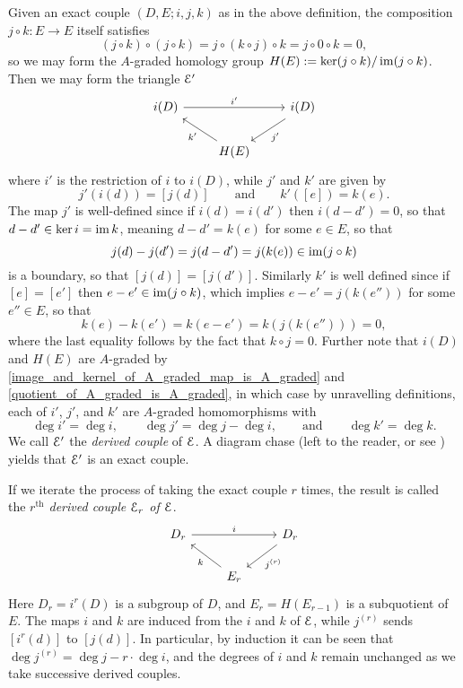 \documentclass[../main.tex]{subfiles}
\begin{document}
\begin{definition}
    Given an exact couple $(D,E;i,j,k)$ as in the above definition, the composition $j\circ k:E\to E$ itself satisfies 
    \[(j\circ k)\circ (j\circ k)=j\circ(k\circ j)\circ k=j\circ 0\circ k=0,\]
    so we may form the $A$-graded homology group $H(E):=\ker(j\circ k)/\operatorname{im}(j\circ k)$. Then we may form the triangle $\mathcal E'$
    \[\begin{tikzcd}
        {i(D)} && {i(D)} \\
        & {H(E)}
        \arrow["{i'}", from=1-1, to=1-3]
        \arrow["{j'}", from=1-3, to=2-2]
        \arrow["{k'}", from=2-2, to=1-1]
    \end{tikzcd}\]
    where $i'$ is the restriction of $i$ to $i(D)$, while $j'$ and $k'$ are given by
    \[j'(i(d))=[j(d)]\qquad\text{and}\qquad k'([e])=k(e).\]
    The map $j'$ is well-defined since if $i(d)=i(d')$ then $i(d-d')=0$, so that $d-d'\in\ker i=\operatorname{im} k$, meaning $d-d'= k(e)$ for some $e\in E$, so that 
    \[j(d)-j(d')=j(d-d')=j(k(e))\in\operatorname{im}(j\circ k)\]
    is a boundary, so that $[j(d)]=[j(d')]$. Similarly $k'$ is well defined since if $[e]=[e']$ then $e-e'\in\operatorname{im}(j\circ k)$, which implies $e-e'=j(k(e''))$ for some $e''\in E$, so that
    \[k(e)-k(e')=k(e-e')=k(j(k(e'')))=0,\]
    where the last equality follows by the fact that $k\circ j=0$. Further note that $i(D)$ and $H(E)$ are $A$-graded by \autoref{image_and_kernel_of_A_graded_map_is_A_graded} and \autoref{quotient_of_A_graded_is_A_graded}, in which case by unravelling definitions, each of $i'$, $j'$, and $k'$ are $A$-graded homomorphisms with
    \[\deg i'=\deg i,\qquad \deg j'=\deg j-\deg i,\qquad\text{and}\qquad\deg k'=\deg k.\]
    We call $\mathcal E'$ the \emph{derived couple} of $\mathcal E$. A diagram chase (left to the reader, or see \cite[Lemma 1.10]{nlab:introduction_to_the_adams_spectral_sequence}) yields that $\mathcal E'$ is an exact couple.

    If we iterate the process of taking the exact couple $r$ times, the result is called the \emph{$r^\text{th}$ derived couple $\mathcal E_r$ of $\mathcal E$}.
    \[\begin{tikzcd}
        {D_r} && {D_r} \\
        & {E_r}
        \arrow["i", from=1-1, to=1-3]
        \arrow["{j^{(r)}}", from=1-3, to=2-2]
        \arrow["k", from=2-2, to=1-1]
    \end{tikzcd}\]
    Here $D_r=i^{r}(D)$ is a subgroup of $D$, and $E_r=H(E_{r-1})$ is a subquotient of $E$. The maps $i$ and $k$ are induced from the $i$ and $k$ of $\mathcal E$, while $j^{(r)}$ sends $[i^r(d)]$ to $[j(d)]$. In particular, by induction it can be seen that $\deg j^{(r)}=\deg j-r\cdot\deg i$, and the degrees of $i$ and $k$ remain unchanged as we take successive derived couples.
\end{definition}
\end{document}
